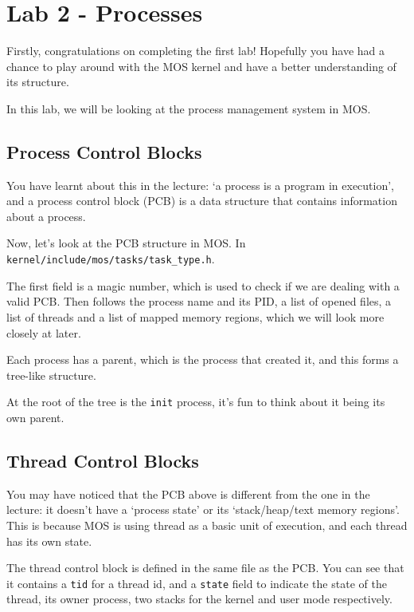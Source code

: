 \chapter{Lab 2 - Processes}


Firstly, congratulations on completing the first lab! Hopefully you have had a chance to play
around with the MOS kernel and have a better understanding of its structure.

In this lab, we will be looking at the process management system in MOS.

\section{Process Control Blocks}

You have learnt about this in the lecture: `a process is a program in execution', and a process
control block (PCB) is a data structure that contains information about a process.

Now, let's look at the PCB structure in MOS. In \texttt{kernel/include/mos/tasks/task\_type.h}.

The first field is a magic number, which is used to check if we are dealing with a valid PCB.
Then follows the process name and its PID, a list of opened files, a list of threads and a list
of mapped memory regions, which we will look more closely at later.

Each process has a parent, which is the process that created it, and this forms a tree-like
structure.

\begin{note}
    \item At the root of the tree is the \texttt{init} process, it's fun to think about
    it being its own parent.
\end{note}

\section{Thread Control Blocks}

You may have noticed that the PCB above is different from the one in the lecture: it doesn't
have a `process state' or its `stack/heap/text memory regions'. This is because MOS is using
thread as a basic unit of execution, and each thread has its own state.

The thread control block is defined in the same file as the PCB. You can see that it contains
a \texttt{tid} for a thread id, and a \texttt{state} field to indicate the state of the thread,
its owner process, two stacks for the kernel and user mode respectively.

